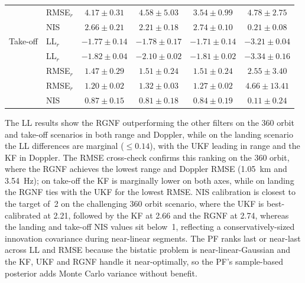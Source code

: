 \documentclass[conference]{IEEEtran}
\begin{document}
\begin{table}[t]
\begin{tabular*}{\columnwidth}{@{\extracolsep{\fill}}llcccc@{}}
      & RMSE$_{\dot r}$ & $4.17{\pm}0.31$ & $4.58{\pm}5.03$ & $\mathbf{3.54{\pm}0.99}$ & $4.78{\pm}2.75$ \\
      & NIS           & $2.66{\pm}0.21$ & $\mathbf{2.21{\pm}0.18}$ & $2.74{\pm}0.10$ & $0.21{\pm}0.08$ \\
\addlinespace
Take-off & LL$_r$        & $-1.77{\pm}0.14$ & $-1.78{\pm}0.17$ & $\mathbf{-1.71{\pm}0.14}$ & $-3.21{\pm}0.04$ \\
         & LL$_{\dot r}$ & $-1.82{\pm}0.04$ & $-2.10{\pm}0.02$ & $\mathbf{-1.81{\pm}0.02}$ & $-3.34{\pm}0.16$ \\
         & RMSE$_r$      & $\mathbf{1.47{\pm}0.29}$ & $1.51{\pm}0.24$ & $1.51{\pm}0.24$ & $2.55{\pm}3.40$ \\
         & RMSE$_{\dot r}$ & $\mathbf{1.20{\pm}0.02}$ & $1.32{\pm}0.03$ & $1.27{\pm}0.02$ & $4.66{\pm}13.41$ \\
         & NIS           & $\mathbf{0.87{\pm}0.15}$ & $0.81{\pm}0.18$ & $0.84{\pm}0.19$ & $0.11{\pm}0.24$ \\
\bottomrule
\end{tabular*}
\end{table}

The LL results show the RGNF outperforming the other filters on the 360\textdegree{} orbit and take-off scenarios in both range and Doppler, while on the landing scenario the LL differences are marginal ($\leq0.14$), with the UKF leading in range and the KF in Doppler. The RMSE cross-check confirms this ranking on the 360\textdegree{} orbit, where the RGNF achieves the lowest range and Doppler RMSE (1.05~km and 3.54~Hz); on take-off the KF is marginally lower on both axes, while on landing the RGNF ties with the UKF for the lowest RMSE. NIS calibration is closest to the target of~2 on the challenging 360\textdegree{} orbit scenario, where the UKF is best-calibrated at 2.21, followed by the KF at 2.66 and the RGNF at 2.74, whereas the landing and take-off NIS values sit below~1, reflecting a conservatively-sized innovation covariance during near-linear segments. The PF ranks last or near-last across LL and RMSE because the bistatic problem is near-linear-Gaussian and the KF, UKF and RGNF handle it near-optimally, so the PF's sample-based posterior adds Monte Carlo variance without benefit.
\end{document}
